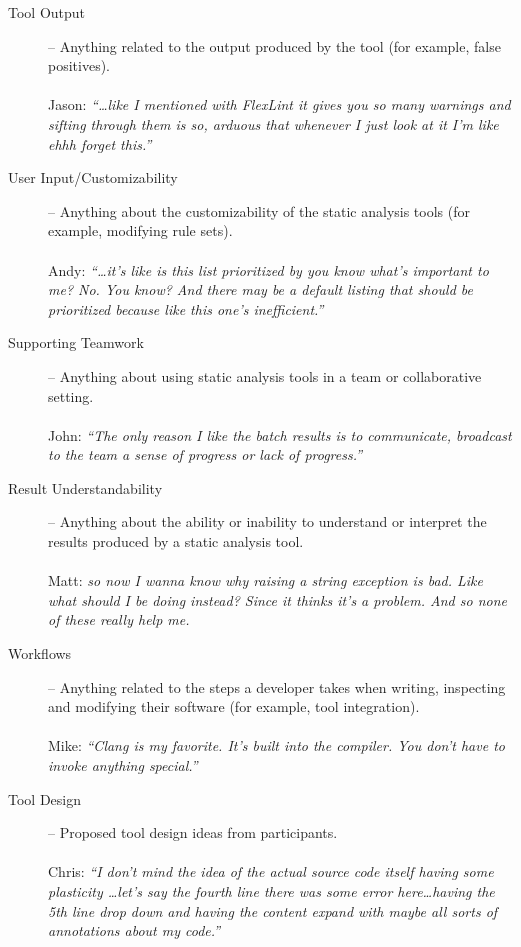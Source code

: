 \documentclass{llncs}
\begin{document}
\begin{description}
	\item[Tool Output] -- Anything related to the output produced by the tool (for example, false positives). \hfill \\ \\
	Jason: \emph{``\ldots like I mentioned with FlexLint it gives you
		so many warnings and sifting through them is so, arduous that whenever I just
		look at it I'm like ehhh forget this.''}
	\\
	\item[User Input/Customizability] -- Anything about the customizability of the static analysis tools (for example, modifying rule sets). \hfill \\ \\
	Andy: \emph{``\ldots it's like is this
		list prioritized by you know what's important to me? No. You know? And there
		may be a default listing that should be prioritized because like this one's
		inefficient.''}
	\\
	\item[Supporting Teamwork] -- Anything about using static analysis tools in a team or collaborative setting. \hfill \\ \\
	John: \emph{``The only reason I like the batch
		results is to communicate, broadcast to the team a sense of progress or lack of
		progress.''}
	\\
	\item[Result Understandability] -- Anything about the ability or inability to understand or interpret the results produced by a static analysis tool.\hfill \\ \\
	Matt: \emph{so now I wanna know why raising a string
		exception is bad. Like what should I be doing instead? Since it thinks it's a
		problem. And so none of these really help me.}
	\\
	\item[Workflows] -- Anything related to the steps a developer takes when writing, inspecting and modifying their software (for example, tool integration).\hfill \\ \\
	Mike: \emph{``Clang is my favorite. It's built into the compiler. You don't
		have to invoke anything special.''}
	\\
	\item[Tool Design] -- Proposed tool design ideas from participants.\hfill \\ \\
	Chris: \emph{``I don't mind the idea of the actual source code itself having
		some plasticity \ldots let's say the fourth line there was some error
		here\ldots having the 5th line drop down and having the content expand with maybe all
		sorts of annotations about my code.''}
\end{description}
\end{document}

